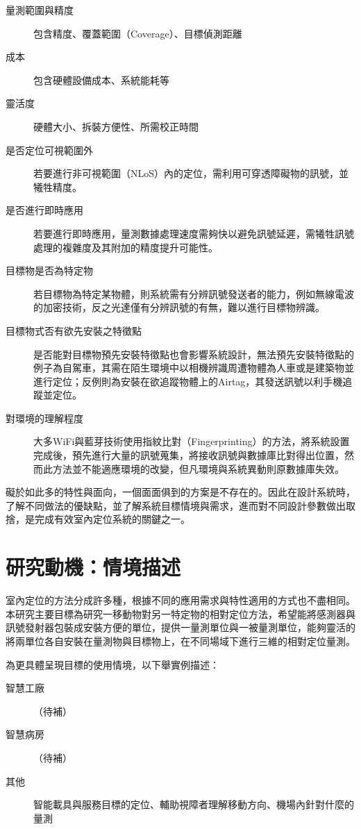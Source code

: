 \begin{description}
    \item[量測範圍與精度] 
    包含精度、覆蓋範圍（Coverage）、目標偵測距離
    \item[成本] 
    包含硬體設備成本、系統能耗等
    \item[靈活度] 
    硬體大小、拆裝方便性、所需校正時間
    \item[是否定位可視範圍外] 
    若要進行非可視範圍（NLoS）內的定位，需利用可穿透障礙物的訊號，並犧牲精度。
    \item[是否進行即時應用] 
    若要進行即時應用，量測數據處理速度需夠快以避免訊號延遲，需犧牲訊號處理的複雜度及其附加的精度提升可能性。
    \item[目標物是否為特定物] 
    若目標物為特定某物體，則系統需有分辨訊號發送者的能力，例如無線電波的加密技術，反之光達僅有分辨訊號的有無，難以進行目標物辨識。
    \item[目標物式否有欲先安裝之特徵點] 
    是否能對目標物預先安裝特徵點也會影響系統設計，無法預先安裝特徵點的例子為自駕車，其需在陌生環境中以相機辨識周遭物體為人車或是建築物並進行定位；反例則為安裝在欲追蹤物體上的Airtag，其發送訊號以利手機追蹤並定位。 
    \item[對環境的理解程度]    
    大多WiFi與藍芽技術使用指紋比對（Fingerprinting）的方法，將系統設置完成後，預先進行大量的訊號蒐集，將接收訊號與數據庫比對得出位置，然而此方法並不能適應環境的改變，但凡環境與系統異動則原數據庫失效。  
\end{description}


礙於如此多的特性與面向，一個面面俱到的方案是不存在的。因此在設計系統時，了解不同做法的優缺點，並了解系統目標情境與需求，進而對不同設計參數做出取捨，是完成有效室內定位系統的關鍵之一\cite{survey_indoor2018}。





\section{研究動機：情境描述}
室內定位的方法分成許多種，根據不同的應用需求與特性適用的方式也不盡相同。本研究主要目標為研究一移動物對另一特定物的相對定位方法，希望能將感測器與訊號發射器包裝成安裝方便的單位，提供一量測單位與一被量測單位，能夠靈活的將兩單位各自安裝在量測物與目標物上，在不同場域下進行三維的相對定位量測。

為更具體呈現目標的使用情境，以下舉實例描述：
\begin{description}
    \item[智慧工廠] （待補）
    \item[智慧病房] （待補）
    \item[其他]  
    智能載具與服務目標的定位、輔助視障者理解移動方向、機場內針對什麼的量測 
\end{description}

